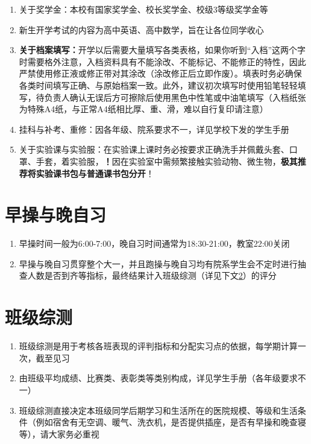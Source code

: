 \begin{enumerate}
\begin{enumerate}
            \end{enumerate}
      \item 关于奖学金\footnotemark：本校有国家奖学金、校长奖学金、校级3等级奖学金等
      \item 新生开学考试\footnotemark 的内容为高中英语、高中数学，旨在让各位同学收心
      \item \textbf{关于档案填写：}开学以后需要大量填写各类表格，如果你听到“入档”这两个字时需要格外注意，入档资料具有不能涂改、不能标记、不能修正的特性，因此严禁使用修正液或修正带对其涂改（涂改修正后立即作废）。填表时务必确保各类时间填写正确、与原始档案一致。此外，建议初次填写时使用铅笔轻轻填写，待负责人确认无误后方可擦除后使用黑色中性笔或中油笔填写（入档纸张为特殊A4纸，与正常A4纸相比厚、重、滑，难以自行复印请注意）
      \item 挂科与补考、重修：因各年级、院系要求不一，详见学校下发的学生手册
      \item 关于实验课与实验服：在实验课上课时务必按要求正确洗手并佩戴头套、口罩、手套，着实验服，\textbf{！}因在实验室中需频繁接触实验动物、微生物，\textbf{极其推荐将实验课书包与普通课书包分开}！
            \label{schoolbag}
\end{enumerate}

\section[早操与晚自习]{早操与晚自习}
\begin{enumerate}
      \item 早操时间一般为6:00-7:00，晚自习时间通常为18:30-21:00，教室22:00关闭
      \item 早操与晚自习贯穿整个大一\footnotemark，并且跑操与晚自习均有院系学生会不定时进行抽查人数是否到齐等指标，最终结果计入班级综测（详见下文\uline{\ref{class_evaluation}}）的评分
\end{enumerate}

\section[班级综测]{班级综测}
\label{class_evaluation}
\begin{enumerate}
      \item 班级综测是用于考核各班表现的评判指标和分配实习点的依据\footnotemark，每学期计算一次，截至见习
      \item 由班级平均成绩、比赛类、表彰类等类别构成，详见学生手册（各年级要求不一）
      \item 班级综测直接决定本班级同学后期学习和生活所在的医院规模、等级和生活条件（例如宿舍有无空调、暖气、洗衣机，是否提供插座，是否有早操和晚查寝\footnotemark 等），请大家务必重视
\end{enumerate}